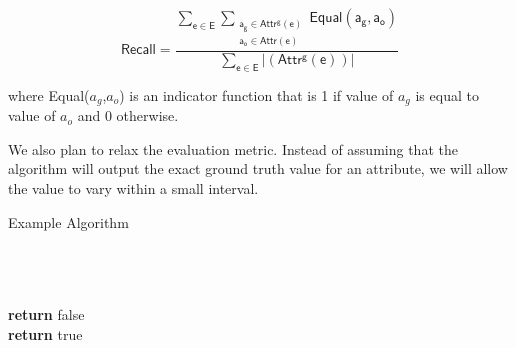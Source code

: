\documentclass{acm_proc_article-sp}
\begin{document}
 \begin{equation}
\mathsf {Recall =\frac {\sum_{e \in E}  \sum_{\substack{a_g \in Attr^g(e) \\ a_o \in Attr(e)}} Equal(a_g,a_o)} {\sum_{e \in E}  |(Attr^g(e))| }}
\end{equation}

where Equal($a_g$,$a_o$) is an indicator function that is 1 if value of $a_g$ is equal to value of $a_o$  and 0 otherwise.

We also plan to relax the evaluation metric. Instead of assuming that the algorithm will output the exact ground truth value for an attribute, we will allow the value to vary within a small interval. 


\begin{algorithm}[H]
\caption{Example Algorithm}
\begin{algorithmic}[1]
 \\
 \\
 \\


\State \textbf{return} false
\EndIf
\EndFor
\\

\State \textbf{return} true
\EndFunction
\end{algorithmic}
\end{algorithm}  



  

\balancecolumns
\end{document}
